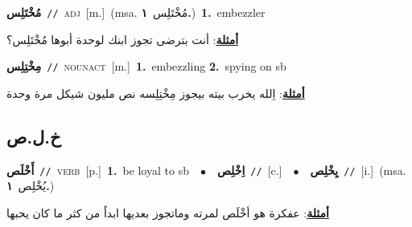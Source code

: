 \documentclass[10pt,a4paper,twoside]{article} %
\begin{document}
\begin{multicols}{2}
{\setlength\topsep{0pt}\textbf{\foreignlanguage{arabic}{مُخْتَلِس}}\ {\color{gray}\texttt{//}\color{black}}\ \textsc{adj}\ [m.]\ \color{gray}(msa. \foreignlanguage{arabic}{مُخْتَلِس}~\foreignlanguage{arabic}{\textbf{١.}})\color{black}\ \textbf{1.}~embezzler\  \begin{flushright}\color{gray}\foreignlanguage{arabic}{\textbf{\underline{\foreignlanguage{arabic}{أمثلة}}}: أنت بترضى تجوز ابنك لوحدة أبوها مُخْتَلِس؟}\end{flushright}\color{black}} \vspace{2mm}

{\setlength\topsep{0pt}\textbf{\foreignlanguage{arabic}{مِخْتِلِس}}\ {\color{gray}\texttt{//}\color{black}}\ \textsc{noun\textunderscore act}\ [m.]\ \textbf{1.}~embezzling  \textbf{2.}~spying on sb\  \begin{flushright}\color{gray}\foreignlanguage{arabic}{\textbf{\underline{\foreignlanguage{arabic}{أمثلة}}}: اِلله يخرب بيته بيجوز مِخْتِلِسه نص مليون شيكل مرة وحدة}\end{flushright}\color{black}} \vspace{2mm}

\vspace{-3mm}
\subsection*{\color{blue}\foreignlanguage{arabic}{خ.ل.ص}\color{blue}{}} 

{\setlength\topsep{0pt}\textbf{\foreignlanguage{arabic}{أَخْلَص}}\ {\color{gray}\texttt{//}\color{black}}\ \textsc{verb}\ [p.]\ \textbf{1.}~be loyal to sb\ \ $\bullet$\ \ \setlength\topsep{0pt}\textbf{\foreignlanguage{arabic}{اِخْلِص}}\ {\color{gray}\texttt{//}\color{black}}\ [c.]\ \ $\bullet$\ \ \setlength\topsep{0pt}\textbf{\foreignlanguage{arabic}{يِخْلِص}}\ {\color{gray}\texttt{//}\color{black}}\ [i.]\ \color{gray}(msa. \foreignlanguage{arabic}{يُخْلِص}~\foreignlanguage{arabic}{\textbf{١.}})\color{black}\  \begin{flushright}\color{gray}\foreignlanguage{arabic}{\textbf{\underline{\foreignlanguage{arabic}{أمثلة}}}: عفكرة هو أخْلَص لمرته وماتجوز بعديها ابداً من كثر ما كان يحبها}\end{flushright}\color{black}} \vspace{2mm}


\end{multicols}
\end{document}
